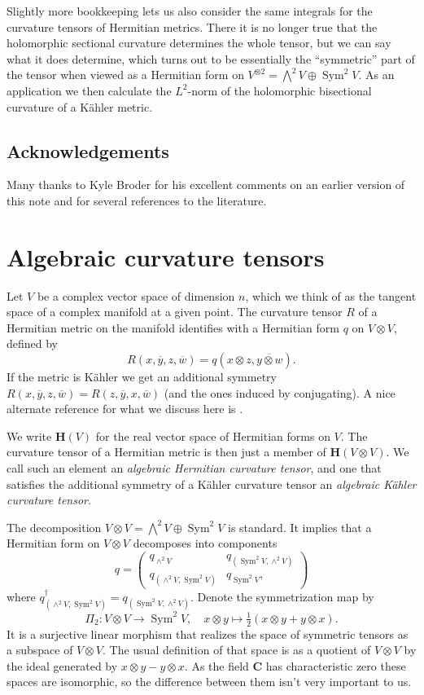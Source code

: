 \documentclass[10pt,a4paper]{amsart}
\theoremstyle{definition}
\def\ov#1{\overline{#1}}
\def\CC{\mathbf{C}}
\def\herm{\mathbf{H}}
\DeclareMathOperator{\Sym}{Sym}
\begin{document}
Slightly more bookkeeping lets us also consider the same integrals for the
curvature tensors of Hermitian metrics. There it is no longer true that the
holomorphic sectional curvature determines the whole tensor, but we can say
what it does determine, which turns out to be essentially the ``symmetric''
part of the tensor when viewed as a Hermitian form on $V^{\otimes 2} =
\bigwedge^{2} V \oplus \Sym^2 V$.
As an application we then calculate the $L^2$-norm of the holomorphic
bisectional curvature of a K\"ahler metric.


\subsection*{Acknowledgements}

Many thanks to Kyle Broder for his excellent comments on an earlier version of
this note and for several references to the literature.

\section{Algebraic curvature tensors}

Let $V$ be a complex vector space of dimension $n$, which we think of as the
tangent space of a complex manifold at a given point.
The curvature tensor $R$ of a Hermitian metric on the manifold identifies with
a Hermitian form $q$ on $V \otimes V$, defined by
$$
R(x, \ov y, z, \ov w)
= q(x \otimes z, \ov{y \otimes w}).
$$
If the metric is K\"ahler we get an additional symmetry
$R(x, \ov y, z, \ov w) = R(z, \ov y, x, \ov w)$
(and the ones induced by conjugating).
A nice alternate reference for what we discuss here is
\cite{algebraic-kahler-curvature}.

We write $\herm(V)$ for the real vector space of Hermitian forms on $V$.
The curvature tensor of a Hermitian metric is then just a member of $\herm(V
\otimes V)$. We call such an element an \emph{algebraic Hermitian curvature
tensor}, and one that satisfies the additional symmetry of a K\"ahler curvature
tensor an \emph{algebraic K\"ahler curvature tensor}.

The decomposition $V \otimes V = \bigwedge^2 V \oplus \Sym^2 V$ is standard.
It implies that a Hermitian form on $V \otimes V$ decomposes into components
$$
q = \begin{pmatrix}
q_{\wedge^2 V} & q_{(\Sym^2V, \wedge^2 V)}
\\
q_{(\wedge^2 V, \Sym^2V)} & q_{\Sym^2 V},
\end{pmatrix}
$$
where $q_{(\wedge^2 V, \Sym^2V)}^\dagger = q_{(\Sym^2V, \wedge^2 V)}$.
Denote the symmetrization map by
$$
\Pi_2 : V \otimes V \to \Sym^2 V,
\quad
x \otimes y \mapsto \tfrac 12 (x \otimes y + y \otimes x).
$$
It is a surjective linear morphism that realizes the space of symmetric tensors
as a subspace of $V \otimes V$.
The usual definition of that space is as a quotient of $V \otimes V$ by the
ideal generated by $x \otimes y - y \otimes x$.
As the field $\CC$ has characteristic zero these spaces are isomorphic,
so the difference between them isn't very important to us.
\end{document}
